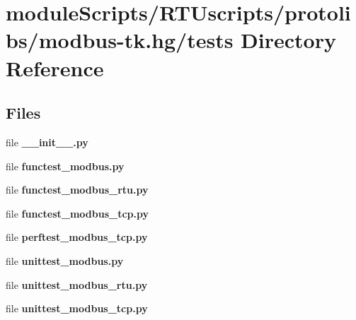 \section{module\+Scripts/\+R\+T\+Uscripts/protolibs/modbus-\/tk.hg/tests Directory Reference}
\label{dir_f7313ac0ac1aab65377fec323220021b}
\subsection*{Files}
\begin{DoxyCompactItemize}
\item 
file {\bf \+\_\+\+\_\+init\+\_\+\+\_\+.\+py}
\item 
file {\bf functest\+\_\+modbus.\+py}
\item 
file {\bf functest\+\_\+modbus\+\_\+rtu.\+py}
\item 
file {\bf functest\+\_\+modbus\+\_\+tcp.\+py}
\item 
file {\bf perftest\+\_\+modbus\+\_\+tcp.\+py}
\item 
file {\bf unittest\+\_\+modbus.\+py}
\item 
file {\bf unittest\+\_\+modbus\+\_\+rtu.\+py}
\item 
file {\bf unittest\+\_\+modbus\+\_\+tcp.\+py}
\end{DoxyCompactItemize}
